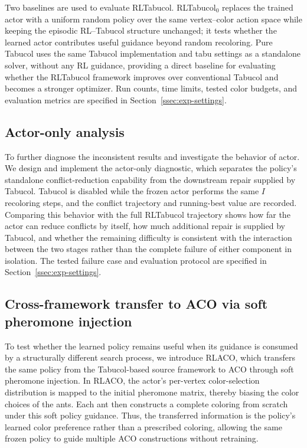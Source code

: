 Two baselines are used to evaluate RLTabucol. RLTabucol$_0$ replaces the trained actor with a uniform random policy over the same vertex--color action space while keeping the episodic RL--Tabucol structure unchanged; it tests whether the learned actor contributes useful guidance beyond random recoloring. Pure Tabucol uses the same Tabucol implementation and tabu settings as a standalone solver, without any RL guidance, providing a direct baseline for evaluating whether the RLTabucol framework improves over conventional Tabucol and becomes a stronger optimizer. Run counts, time limits, tested color budgets, and evaluation metrics are specified in Section~\ref{ssec:exp-settings}.

\subsection{Actor-only analysis}
\label{ssec:actor-only}

To further diagnose the inconsistent results and investigate the behavior of actor. We design and implement the actor-only diagnostic, which separates the policy's standalone conflict-reduction capability from the downstream repair supplied by Tabucol. Tabucol is disabled while the frozen actor performs the same $I$ recoloring steps, and the conflict trajectory and running-best value are recorded. Comparing this behavior with the full RLTabucol trajectory shows how far the actor can reduce conflicts by itself, how much additional repair is supplied by Tabucol, and whether the remaining difficulty is consistent with the interaction between the two stages rather than the complete failure of either component in isolation. The tested failure case and evaluation protocol are specified in Section~\ref{ssec:exp-settings}.

\subsection{Cross-framework transfer to ACO via soft pheromone injection}
\label{ssec:rlaco}

To test whether the learned policy remains useful when its guidance is consumed by a structurally different search process, we introduce RLACO, which transfers the same policy from the Tabucol-based source framework to ACO through soft pheromone injection. In RLACO, the actor's per-vertex color-selection distribution is mapped to
the initial pheromone matrix, thereby biasing the color choices of the ants.
Each ant then constructs a complete coloring from scratch under this soft
policy guidance. Thus, the transferred information is the policy's learned
color preference rather than a prescribed coloring, allowing the same frozen policy to guide multiple ACO constructions without retraining.

